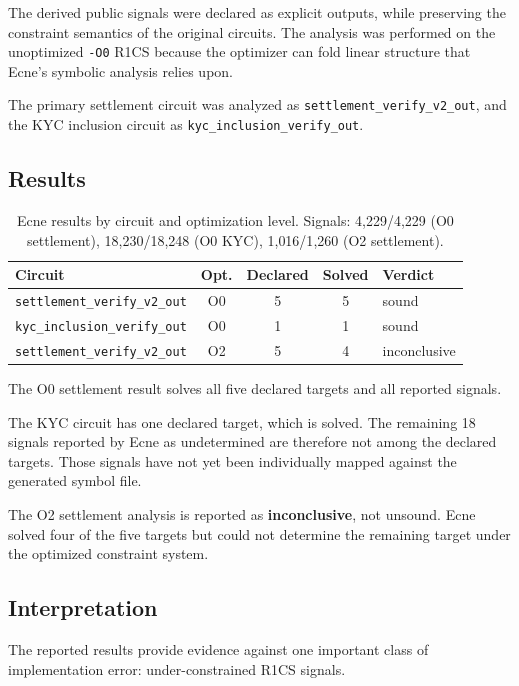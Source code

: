 \documentclass[10pt,twocolumn]{article}
\newcommand{\code}[1]{\texttt{#1}}
\begin{document}
The derived public signals were declared as explicit outputs, while
preserving the constraint semantics of the original circuits. The
analysis was performed on the unoptimized \code{-O0} R1CS because the
optimizer can fold linear structure that Ecne's symbolic analysis relies
upon.

The primary settlement circuit was analyzed as
\code{settlement\_verify\_v2\_out}, and the KYC inclusion circuit as
\code{kyc\_inclusion\_verify\_out}.

\subsection{Results}

\begin{table}[t]
\centering
\small
\begin{tabular}{@{}lcccl@{}}
\toprule
Circuit & Opt. & Declared & Solved & Verdict \\
\midrule
\code{settlement\_verify\_v2\_out} & O0 & 5 & 5 & sound \\
\code{kyc\_inclusion\_verify\_out} & O0 & 1 & 1 & sound \\
\code{settlement\_verify\_v2\_out} & O2 & 5 & 4 & inconclusive \\
\bottomrule
\end{tabular}
\caption{Ecne results by circuit and optimization level. Signals:
4{,}229/4{,}229 (O0 settlement), 18{,}230/18{,}248 (O0 KYC),
1{,}016/1{,}260 (O2 settlement).}
\end{table}

The O0 settlement result solves all five declared targets and all
reported signals.

The KYC circuit has one declared target, which is solved. The remaining
18 signals reported by Ecne as undetermined are therefore not among the
declared targets. Those signals have not yet been individually mapped
against the generated symbol file.

The O2 settlement analysis is reported as \textbf{inconclusive}, not
unsound. Ecne solved four of the five targets but could not determine
the remaining target under the optimized constraint system.

\subsection{Interpretation}

The reported results provide evidence against one important class of
implementation error: under-constrained R1CS signals.
\end{document}
